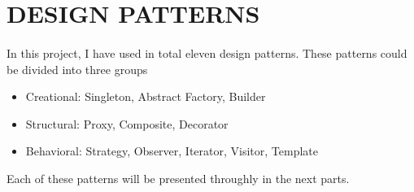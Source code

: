 \section{DESIGN PATTERNS}

\paragraph{}
In this project, I have used in total eleven design patterns. These patterns could be divided into three groups

\begin{itemize}
\item Creational: Singleton, Abstract Factory, Builder
\item Structural: Proxy, Composite, Decorator
\item Behavioral: Strategy, Observer, Iterator, Visitor, Template
\end{itemize}

Each of these patterns will be presented throughly in the next parts.